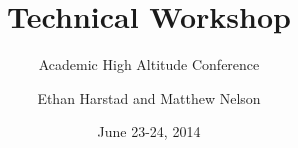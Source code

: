 \documentclass[t]{beamer}
\title{Technical Workshop}
\subtitle{Academic High Altitude Conference}
\author{Ethan Harstad and Matthew Nelson}
\institute{Stratospheric Ballooning Association}
\date{June 23-24, 2014}
\numberwithin{section}{part}
\begin{document}
\begin{frame}
	\titlepage
\end{frame}






\end{document}
